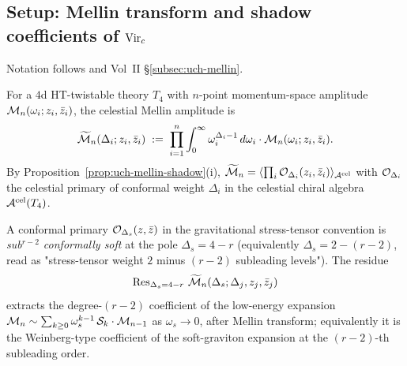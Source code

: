 \subsection{Setup: Mellin transform and shadow coefficients of $\mathrm{Vir}_c$}
\label{subsec:smsb-setup}

Notation follows
\cite{PasterskiShaoStromingerFlatSpaceHolog,StromingerLectures2018,
HamadaShiuSubsubSoft,GuevaraHimwichPateStrominger21,
StromingerWInfinityCelestial} and Vol~II
\S\ref{subsec:uch-mellin}.

\begin{definition}
\label{def:smsb-celestial-mellin}
\ClaimStatusProvedElsewhere
For a $4$d HT-twistable theory $T_4$ with $n$-point momentum-space
amplitude $\mathcal M_n(\omega_i; z_i, \bar z_i)$, the celestial Mellin
amplitude is
\[
 \widetilde{\mathcal M}_n(\Delta_i; z_i, \bar z_i)
 \;:=\;
 \prod_{i=1}^n \int_0^\infty \omega_i^{\Delta_i - 1}\, d\omega_i\cdot
 \mathcal M_n(\omega_i; z_i, \bar z_i).
\]
By Proposition~\ref{prop:uch-mellin-shadow}(i),
$\widetilde{\mathcal M}_n = \langle \prod_i \mathcal O_{\Delta_i}(z_i, \bar z_i)
\rangle_{\mathcal A^{\mathrm{cel}}}$ with $\mathcal O_{\Delta_i}$ the celestial primary
of conformal weight $\Delta_i$ in the celestial chiral algebra
$\mathcal A^{\mathrm{cel}}(T_4)$.
\end{definition}

\begin{definition}
\label{def:smsb-soft-pole}
\ClaimStatusProvedElsewhere
A conformal primary $\mathcal O_{\Delta_s}(z, \bar z)$ in the gravitational
stress-tensor convention is \emph{sub${}^{r-2}$ conformally soft} at
the pole $\Delta_s = 4 - r$ (equivalently
$\Delta_s = 2 - (r - 2)$, read as "stress-tensor weight $2$ minus
$(r - 2)$ subleading levels"). The residue
\[
 \operatorname{Res}_{\Delta_s = 4 - r}\,
 \widetilde{\mathcal M}_n(\Delta_s; \Delta_j, z_j, \bar z_j)
\]
extracts the degree-$(r - 2)$ coefficient of the low-energy expansion
$\mathcal M_n \sim \sum_{k \geq 0} \omega_s^{k - 1}\, \mathcal S_k \cdot \mathcal M_{n-1}$ as
$\omega_s \to 0$, after Mellin transform; equivalently it is the
Weinberg-type coefficient of the soft-graviton expansion at the
$(r - 2)$-th subleading order.
\end{definition}

